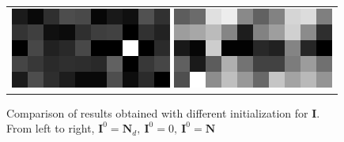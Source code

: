 \documentclass{article}
\newcommand{\I}{\textbf{I}}
\newcommand{\N}{\textbf{N}}
\newcommand{\Nd}{\textbf{N$_d$}}
\begin{document}
\begin{figure}
\begin{center}
\begin{tabular}{c}
		\includegraphics[scale=1]{images/kernels_0.png}
		\includegraphics[scale=1]{images/kernels_N.png}
	\end{tabular}
	\caption{Comparison of results obtained with different initialization for \I. From left to right, $\I^0 = \Nd,\ \I^0 = 0,\ \I^0 = \N$ }
	\label{init}
\end{center}
\end{figure}
\end{document}
